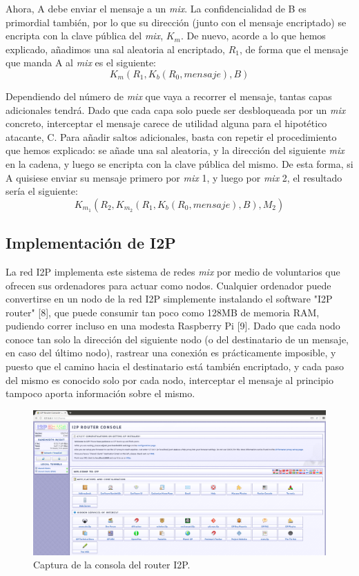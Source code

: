 \documentclass{article}
\begin{document}
Ahora, A debe enviar el mensaje a un \textit{mix}. La confidencialidad de B es primordial también, por lo que su dirección (junto con el mensaje encriptado) se encripta con la clave pública del \textit{mix},
\(K_m\). De nuevo, acorde a lo que hemos explicado, añadimos una sal aleatoria al encriptado, \(R_1\), de forma que el mensaje que manda A al \textit{mix} es el siguiente: \[K_m(R_1, K_b(R_0, mensaje), B)\]

Dependiendo del número de \textit{mix} que vaya a recorrer el mensaje, tantas capas adicionales tendrá. Dado que cada capa solo puede ser desbloqueada por un \textit{mix} concreto, interceptar
el mensaje carece de utilidad alguna para el hipotético atacante, C. Para añadir saltos adicionales, basta con repetir el procedimiento que hemos explicado: se añade una sal aleatoria, y la dirección
del siguiente \textit{mix} en la cadena, y luego se encripta con la clave pública del mismo. De esta forma, si A quisiese enviar su mensaje primero por \textit{mix} 1, y luego por \textit{mix} 2,
el resultado sería el siguiente: \[K_m_1(R_2, K_m_2(R_1, K_b(R_0, mensaje), B), M_2)\]

\subsection{Implementación de I2P}

La red I2P implementa este sistema de redes \textit{mix} por medio de voluntarios que ofrecen sus ordenadores para actuar como nodos. Cualquier ordenador puede convertirse en un nodo de la red
I2P simplemente instalando el software "I2P router" [8], que puede consumir tan poco como 128MB de memoria RAM, pudiendo correr incluso en una modesta Raspberry Pi [9].
Dado que cada nodo conoce tan solo la dirección del siguiente nodo (o del destinatario de un mensaje, en caso del último nodo), rastrear una conexión es prácticamente imposible, y puesto que el camino
hacia el destinatario está también encriptado, y cada paso del mismo es conocido solo por cada nodo, interceptar el mensaje al principio tampoco aporta información sobre el mismo.

\begin{figure}
    \includegraphics[width=\linewidth]{media/I2P Router Console.png}
    \caption{Captura de la consola del router I2P.}
    \label{fig2}
\end{figure}
\end{document}
